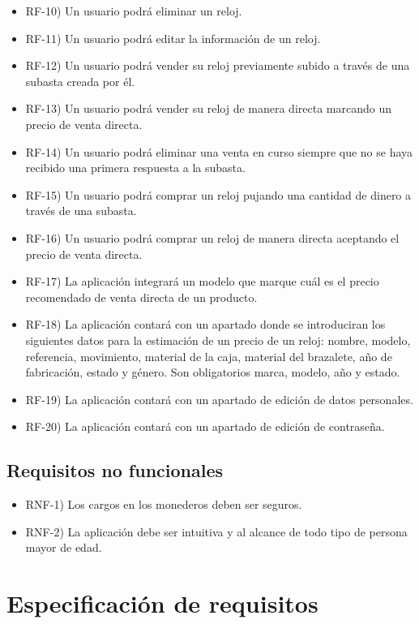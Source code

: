 \begin{itemize}
	\item RF-10) Un usuario podrá eliminar un reloj.
	\item RF-11) Un usuario podrá editar la información de un reloj.
	\item RF-12) Un usuario podrá vender su reloj previamente subido a través de una subasta creada por él.
	\item RF-13) Un usuario podrá vender su reloj de manera directa marcando un precio de venta directa.	
	\item RF-14) Un usuario podrá eliminar una venta en curso siempre que no se haya recibido una primera respuesta a la subasta.
	\item RF-15) Un usuario podrá comprar un reloj pujando una cantidad de dinero a través de una subasta.
	\item RF-16) Un usuario podrá comprar un reloj de manera directa aceptando el precio de venta directa.	
	\item RF-17) La aplicación integrará un modelo que marque cuál es el precio recomendado de venta directa de un producto.
	\item RF-18) La aplicación contará con un apartado donde se introduciran los siguientes datos para la estimación de un precio de un reloj: nombre, modelo, referencia, movimiento, material de la caja, material del brazalete, año de fabricación, estado y género. Son obligatorios marca, modelo, año y estado.
	\item RF-19) La aplicación contará con un apartado de edición de datos personales.
	\item RF-20) La aplicación contará con un apartado de edición de contraseña.
\end{itemize}

\subsection{Requisitos no funcionales}

\begin{itemize}
	\item RNF-1) Los cargos en los monederos deben ser seguros.
	\item RNF-2) La aplicación debe ser intuitiva y al alcance de todo tipo de persona mayor de edad.
\end{itemize}

\section{Especificación de requisitos}

